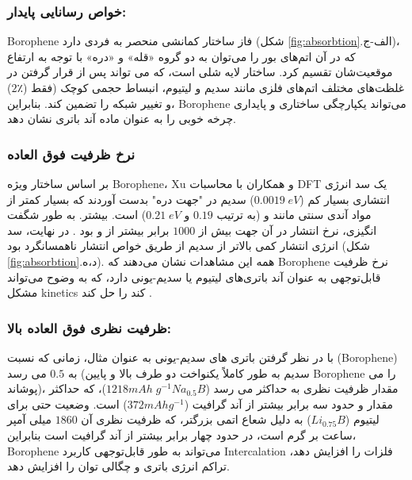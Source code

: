\subsubsection{خواص رسانایی پایدار:}
\gls{Borophene} فاز  ساختار کمانشی منحصر به فردی دارد (شکل \ref{fig:absorbtion}.الف-ج)، که در آن اتم‌های بور را می‌توان به دو گروه «قله» و «دره» با توجه به ارتفاع موقعیت‌شان تقسیم کرد.\cite{mannixSynthesisBorophenesAnisotropic2015} ساختار لایه شلی است، که می تواند پس از قرار گرفتن در غلظت‌های مختلف اتم‌های فلزی مانند سدیم و لیتیوم، انبساط حجمی کوچک (فقط ($2٪$) و تغییر شبکه را تضمین کند. بنابراین، \gls{Borophene} می‌تواند یکپارچگی ساختاری و پایداری چرخه خوبی را به عنوان ماده آند باتری نشان دهد.

\subsubsection{نرخ ظرفیت فوق العاده}
بر اساس ساختار ویژه \gls{Borophene}، \gls{Xu} و همکاران \cite{shiInitioPredictionBorophene2016} با محاسبات \gls{DFT} یک سد انرژی انتشاری بسیار کم ($0.0019\;eV$) سدیم در "جهت دره" بدست آوردند که بسیار کمتر از مواد آندی سنتی مانند  و  (به ترتیب $0.19$ و $0.21\; eV$) است. بیشتر. به طور شگفت انگیزی، نرخ انتشار در آن جهت بیش از $1000$ برابر بیشتر از  و  بود \cite{baggettoIntrinsicThermodynamicKinetic2013, gonzeFirstprinciplesComputationMaterial2002, panSodiumStorageTransport2013}. در نهایت، سد انرژی انتشار  کمی بالاتر از سدیم از طریق خواص انتشار ناهمسانگرد بود (شکل \ref{fig:absorbtion}.د،ه).  همه این مشاهدات نشان می‌دهند که \gls{Borophene} نرخ ظرفیت قابل‌توجهی به عنوان آند باتری‌های لیتیوم یا سدیم-یونی دارد، که به وضوح می‌تواند مشکل \gls{kinetics} کند را حل کند \cite{shiInitioPredictionBorophene2016}.

\subsubsection{ظرفیت نظری فوق العاده بالا:}
با در نظر گرفتن باتری های سدیم-یونی به عنوان مثال، زمانی که نسبت  (\gls{Borophene}) به $0.5$ می رسد (سدیم به طور کاملاً یکنواخت دو طرف بالا و پایین \gls{Borophene} را می پوشاند)، مقدار ظرفیت نظری به حداکثر می رسد ($1218 mAh\; g^{-1} Na_{0.5}B$)، \cite{shiInitioPredictionBorophene2016} که حداکثر مقدار و حدود سه برابر بیشتر از آند گرافیت ($372 mAh g^{-1}$) است. وضعیت حتی برای لیتیوم ($Li_{0.75}B$) به دلیل شعاع اتمی بزرگتر، که ظرفیت نظری آن $1860$ میلی آمپر ساعت بر گرم است، در حدود چهار برابر بیشتر از آند گرافیت است \cite{jiangBorophenePromisingAnode2016} بنابراین، \gls{Borophene} می‌تواند به طور قابل‌توجهی کاربرد \gls{Intercalation} فلزات را افزایش دهد، تراکم انرژی باتری و چگالی توان را افزایش دهد.

